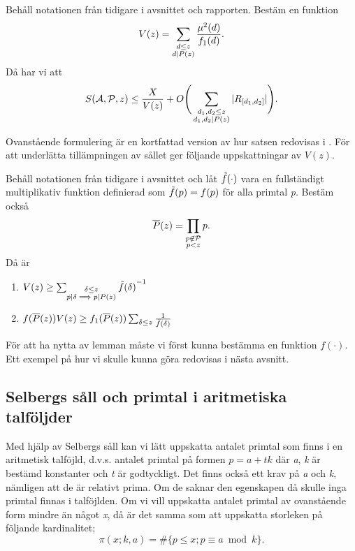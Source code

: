 \begin{theorem}\label{thm:SelbergSieve} Behåll notationen från tidigare i avsnittet och rapporten. Bestäm en funktion
\begin{equation}
    V(z) = \sum_{\substack{d\leq z\\ d\divides P(z)}}\frac{\mu^2(d)}{f_1(d)}.\nonumber
\end{equation}
Då har vi att
\begin{equation}
    \S{A}{P}{z} \leq \frac{X}{V(z)} + O\Bigg(\sum_{\substack{d_1,d_2\leq z\\d_1,d_2\divides P(z)}}|R_{[d_1, d_2]}|\Bigg).\nonumber
\end{equation}
\end{theorem}
Ovanstående formulering är en kortfattad version av hur satsen redovisas i \cite{cojocarumurty}. För att underlätta tillämpningen av sållet ger \cite{cojocarumurty} följande uppskattningar av \(V(z)\).
\begin{lemma}[Uppskattningar av \(V(z)\)]\label{thm:SelVApp}
Behåll notationen från tidigare i avsnittet och låt \(\Tilde{f}(\cdot)\) vara en fullständigt multiplikativ funktion definierad som \(\Tilde{f}(p) = f(p)\) för alla primtal \textit{p}. Bestäm också
\begin{equation}
    \overline{P}(z) = \prod_{\substack{p\not\in\P\\p<z}} p.\nonumber
\end{equation}
Då är
\begin{enumerate}
    \item \(
         V(z) \geq \sum_{\substack{\delta\leq z\\p\divides\delta\implies p\divides P(z)}} {\Tilde{f}(\delta)}^{-1}\nonumber\)
    \item \(
        f(\overline{P}(z))V(z) \geq f_1(\overline{P}(z))\sum_{\delta \leq z}\frac{1}{\Tilde{f}(\delta)}\nonumber
    \)
\end{enumerate}
\end{lemma}
För att ha nytta av lemman måste vi först kunna bestämma en funktion \(f(\cdot)\). Ett exempel på hur vi skulle kunna göra redovisas i nästa avsnitt.

\subsection{Selbergs såll och primtal i aritmetiska talföljder}

Med hjälp av Selbergs såll kan vi lätt uppskatta antalet primtal som finns i en aritmetisk talföjld, d.v.s. antalet primtal på formen \(p = a + tk\) där \textit{a}, \textit{k} är bestämd konstanter och \textit{t} är godtyckligt. Det finns också ett krav på \textit{a} och \textit{k}, nämligen att de är relativt prima. Om de saknar den egenskapen då skulle inga primtal finnas i talföjlden. Om vi vill uppskatta antalet primtal av ovanstående form mindre än något \textit{x}, då är det samma som att uppskatta storleken på följande kardinalitet;
\begin{equation}
    \pi(x;k,a) = \#\{p\leq x; p \equiv a \bmod{k}\}.\label{sel.apl.arithPrimes}
\end{equation}


